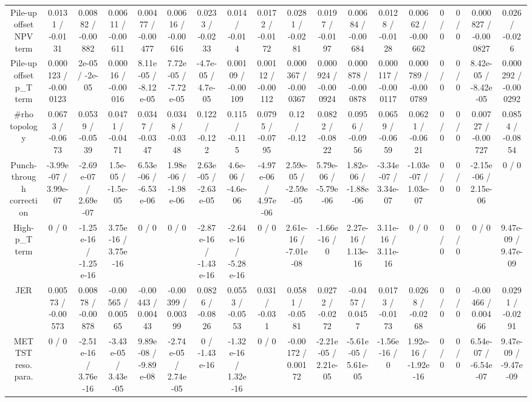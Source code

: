 \documentclass[10pt]{article}
\begin{document}
\begin{table}[htbp]
\begin{center}
\begin{tabular}{|c|c|c|c|c|c|c|c|c|c|c|c|c|c|c|c|c|c|}
  Pile-up offset NPV term & 0.0131 / -0.0131 & 0.00882 / -0.00882 & 0.00611 / -0.00611 & 0.00477 / -0.00477 & 0.00616 / -0.00616 & 0.0233 / -0.0233 & 0.014 / -0.014 & 0.0172 / -0.0172 & 0.0281 / -0.0281 & 0.0197 / -0.0197 & 0.00684 / -0.00684 & 0.0128 / -0.0128 & 0.00662 / -0.00662 & 0 / 0 & 0 / 0 & 0.000827 / -0.000827 & 0.026 / -0.026 \\ 
  Pile-up offset p_{T} term & 0.000123 / -0.000123 & 2e-05 / -2e-05 & 0.00016 / -0.00016 & 8.11e-05 / -8.12e-05 & 7.72e-05 / -7.72e-05 & -4.7e-05 / 4.7e-05 & 0.00109 / -0.00109 & 0.00112 / -0.00112 & 0.000367 / -0.000367 & 0.000924 / -0.000924 & 0.000878 / -0.000878 & 0.000117 / -0.000117 & 0.000789 / -0.000789 & 0 / 0 & 0 / 0 & 8.42e-05 / -8.42e-05 & 0.000292 / -0.000292 \\ 
  #rho topology & 0.0673 / -0.0673 & 0.0539 / -0.0539 & 0.0471 / -0.0471 & 0.0347 / -0.0347 & 0.0348 / -0.0348 & 0.122 / -0.122 & 0.115 / -0.115 & 0.0795 / -0.0795 & 0.12 / -0.12 & 0.0822 / -0.0822 & 0.0956 / -0.0956 & 0.0659 / -0.0659 & 0.0621 / -0.0621 & 0 / 0 & 0 / 0 & 0.00727 / -0.00727 & 0.0854 / -0.0854 \\ 
  Punch-through correction & -3.99e-07 / 3.99e-07 & -2.69e-07 / 2.69e-07 & 1.5e-05 / -1.5e-05 & 6.53e-06 / -6.53e-06 & 1.98e-06 / -1.98e-06 & 2.63e-05 / -2.63e-05 & 4.6e-06 / -4.6e-06 & -4.97e-06 / 4.97e-06 & 2.59e-05 / -2.59e-05 & 5.79e-06 / -5.79e-06 & 1.82e-06 / -1.88e-06 & -3.34e-07 / 3.34e-07 & -1.03e-07 / 1.03e-07 & 0 / 0 & 0 / 0 & -2.15e-06 / 2.15e-06 & 0 / 0 \\ 
  High-p_{T} term & 0 / 0 & -1.25e-16 / -1.25e-16 & 3.75e-16 / 3.75e-16 & 0 / 0 & 0 / 0 & -2.87e-16 / -1.43e-16 & -2.64e-16 / -5.28e-16 & 0 / 0 & 2.61e-16 / -7.01e-08 & -1.66e-16 / 0 & 2.27e-16 / 1.13e-16 & 3.11e-16 / 3.11e-16 & 0 / 0 & 0 / 0 & 0 / 0 & 0 / 0 & 9.47e-09 / 9.47e-09 \\ 
  JER & 0.00573 / -0.00573 & 0.00878 / -0.00878 & -0.00565 / 0.00565 & -0.00443 / 0.00443 & -0.00399 / 0.00399 & 0.0826 / -0.0826 & 0.0553 / -0.0553 & 0.031 / -0.031 & 0.0581 / -0.0581 & 0.0272 / -0.0272 & -0.0457 / 0.0457 & 0.0173 / -0.0173 & 0.0268 / -0.0268 & 0 / 0 & 0 / 0 & -0.00466 / 0.00466 & 0.0291 / -0.0291 \\ 
  MET TST reso. para. & 0 / 0 & -2.51e-16 / 3.76e-16 & -3.43e-05 / 3.43e-05 & 9.89e-08 / -9.89e-08 & -2.74e-05 / 2.74e-05 & 0 / -1.43e-16 & -1.32e-16 / 1.32e-16 & 0 / 0 & -0.00172 / 0.00172 & -2.21e-05 / 2.21e-05 & -5.61e-05 / 5.61e-05 & -1.56e-16 / 0 & 1.92e-16 / -1.92e-16 & 0 / 0 & 0 / 0 & 6.54e-07 / -6.54e-07 & 9.47e-09 / -9.47e-09 \\ 

\end{tabular}
\end{center}
\end{table}
\end{document}
